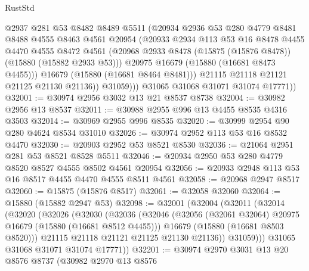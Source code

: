 \begin{lexlean}{RustStd}
\begin{coremodule}
                  @2937
                  @281
                  @53
                  @8482
                  @8489
                  @5511
                  (@20934
                    @2936
                    @53
                    @280
                    @4779
                    @8481
                    @8488
                    @4555
                    @8463
                    @4561
                    @20954
                    (@20933
                      @2934
                      @113
                      @53
                      @16
                      @8478
                      @4455
                      @4470
                      @4555
                      @8472
                      @4561
                      (@20968 @2933 @8478 (@15875 (@15876 @8478)) (@15880 (@15882 @2933 @53)))
                      @20975
                      @16679
                      (@15880 (@16681 @8473 @4455)))
                    @16679
                    (@15880 (@16681 @8464 @8481)))
                  @21115
                  @21118
                  @21121
                  @21125
                  @21130
                  @21136))
              @31059)))
        @31065
        @31068
        @31071
        @31074
        @17771))
@32001 := @30974 @2956 @3032 @13 @21 @8537 @8738
@32004 := @30982 @2956 @13 @8537
@32011 := @30988 @2955 @996 @13 @4455 @8535 @4316 @3503
@32014 := @30969 @2955 @996 @8535
@32020 := @30999 @2954 @90 @280 @4624 @8534 @31010
@32026 := @30974 @2952 @113 @53 @16 @8532 @4470
@32030 := @20903 @2952 @53 @8521 @8530
@32036 := @21064 @2951 @281 @53 @8521 @8528 @5511
@32046 := @20934 @2950 @53 @280 @4779 @8520 @8527 @4555 @8502 @4561 @20954
@32056 := @20933 @2948 @113 @53 @16 @8517 @4455 @4470 @4555 @8511 @4561
@32058 := @20968 @2947 @8517
@32060 := @15875 (@15876 @8517)
@32061 := @32058 @32060
@32064 := @15880 (@15882 @2947 @53)
@32098 := @32001
    (@32004
      (@32011
        (@32014
          (@32020
            (@32026
              (@32030
                (@32036
                  (@32046
                    (@32056 (@32061 @32064) @20975 @16679 (@15880 (@16681 @8512 @4455)))
                    @16679
                    (@15880 (@16681 @8503 @8520)))
                  @21115
                  @21118
                  @21121
                  @21125
                  @21130
                  @21136))
              @31059)))
        @31065
        @31068
        @31071
        @31074
        @17771))
@32201 := @30974
    @2970
    @3031
    @13
    @20
    @8576
    @8737
    (@30982
      @2970
      @13
      @8576

\end{coremodule}
\end{lexlean}
